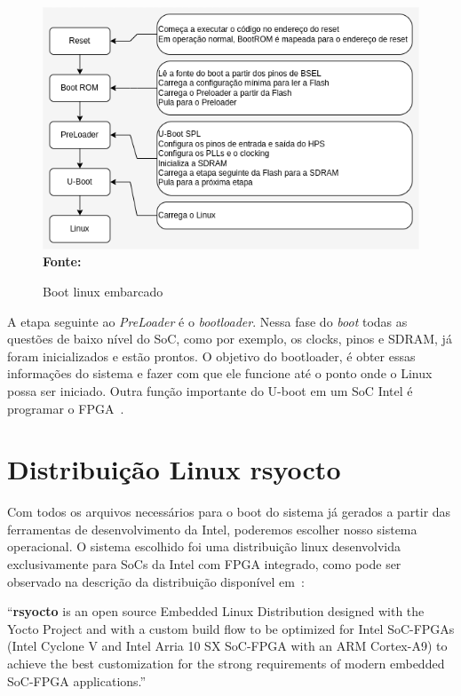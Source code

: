 \begin{figure}[ht]
	\caption{Boot linux embarcado}
	\begin{center}
		\includegraphics[scale=0.65]{imagens/embeddedLinux.png}\\
		{\small \textbf{Fonte:}\cite{SocLinux}}
    \end{center}\label{fig:linux}
\end{figure}

A etapa seguinte ao \textit{PreLoader} é o \textit{bootloader}. Nessa fase do \textit{boot} todas as questões de baixo nível do SoC, como por exemplo, os clocks, pinos e SDRAM, já foram inicializados e estão prontos. O objetivo do bootloader, é obter essas informações do sistema e fazer com que ele funcione até o ponto onde o Linux possa ser iniciado. Outra função importante do U-boot em um SoC Intel é programar o FPGA~\cite{SocLinux}.

\section{Distribuição Linux rsyocto}
Com todos os arquivos necessários para o boot do sistema já gerados a partir das ferramentas de desenvolvimento da Intel, poderemos escolher nosso sistema operacional. O sistema escolhido foi uma distribuição linux desenvolvida exclusivamente para SoCs da Intel com FPGA integrado, como pode ser observado na descrição da distribuição disponível em~\cite{rsyocto}:

\begin{citacao}
	``\textbf{rsyocto} is an open source Embedded Linux Distribution designed with the Yocto Project and with a custom build flow to be optimized for Intel SoC-FPGAs (Intel Cyclone V and Intel Arria 10 SX SoC-FPGA with an ARM Cortex-A9) to achieve the best customization for the strong requirements of modern embedded SoC-FPGA applications.''
\end{citacao} 

